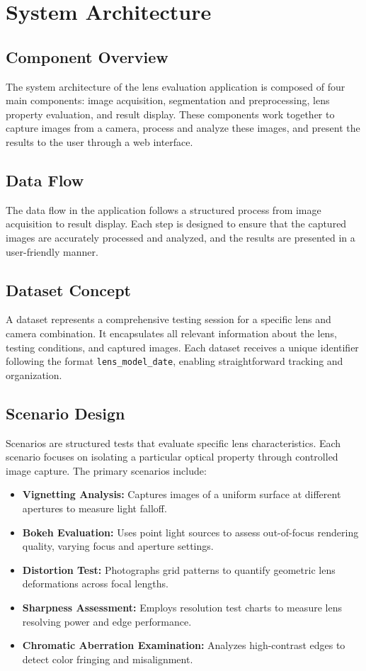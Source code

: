 \section{System Architecture}

\subsection{Component Overview}
The system architecture of the lens evaluation application is composed of four main components: image acquisition, segmentation and preprocessing, lens property evaluation, and result display. These components work together to capture images from a camera, process and analyze these images, and present the results to the user through a web interface.

\subsection{Data Flow}
The data flow in the application follows a structured process from image acquisition to result display. Each step is designed to ensure that the captured images are accurately processed and analyzed, and the results are presented in a user-friendly manner.

\subsection{Dataset Concept}
A dataset represents a comprehensive testing session for a specific lens and camera combination. It encapsulates all relevant information about the lens, testing conditions, and captured images. Each dataset receives a unique identifier following the format \texttt{lens\_model\_date}, enabling straightforward tracking and organization.

\subsection{Scenario Design}
Scenarios are structured tests that evaluate specific lens characteristics. Each scenario focuses on isolating a particular optical property through controlled image capture. The primary scenarios include:
\begin{itemize}
    \item \textbf{Vignetting Analysis:} Captures images of a uniform surface at different apertures to measure light falloff.
    \item \textbf{Bokeh Evaluation:} Uses point light sources to assess out-of-focus rendering quality, varying focus and aperture settings.
    \item \textbf{Distortion Test:} Photographs grid patterns to quantify geometric lens deformations across focal lengths.
    \item \textbf{Sharpness Assessment:} Employs resolution test charts to measure lens resolving power and edge performance.
    \item \textbf{Chromatic Aberration Examination:} Analyzes high-contrast edges to detect color fringing and misalignment.
\end{itemize}

